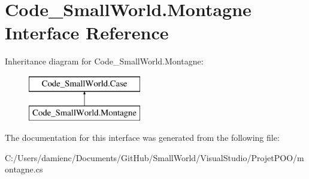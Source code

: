 \hypertarget{interface_code___small_world_1_1_montagne}{\section{Code\-\_\-\-Small\-World.\-Montagne Interface Reference}
\label{interface_code___small_world_1_1_montagne}
}
Inheritance diagram for Code\-\_\-\-Small\-World.\-Montagne\-:\begin{figure}[H]
\begin{center}
\leavevmode
\includegraphics[height=2.000000cm]{interface_code___small_world_1_1_montagne}
\end{center}
\end{figure}


The documentation for this interface was generated from the following file\-:\begin{DoxyCompactItemize}
\item 
C\-:/\-Users/damienc/\-Documents/\-Git\-Hub/\-Small\-World/\-Visual\-Studio/\-Projet\-P\-O\-O/montagne.\-cs\end{DoxyCompactItemize}
